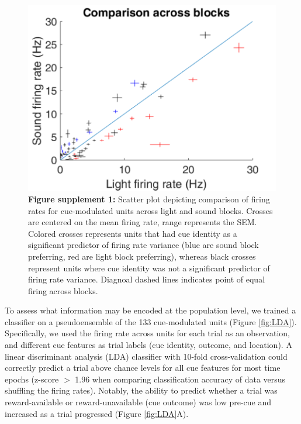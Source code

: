 \documentclass[11pt]{article}
\newcommand{\bsf}[1]{\textbf{#1}}
\begin{document}
 \begin{figure}[ht!]
\centering
\includegraphics[height=0.3\textheight]{Fig 6 - SUPP scatter.pdf}
\caption*{\bsf{Figure supplement 1:} Scatter plot depicting comparison
  of firing rates for cue-modulated units across light and sound
  blocks. Crosses are centered on the mean firing rate, range
  represents the SEM. Colored crosses represents units that had cue
  identity as a significant predictor of firing rate variance (blue
  are sound block preferring, red are light block preferring), whereas
  black crosses represent units where cue identity was not a
  significant predictor of firing rate variance. Diagnoal dashed lines
  indicates point of equal firing across blocks.}
\label{fig:scat}
\end{figure} \clearpage

To assess what information may be encoded at the population level, we
trained a classifier on a pseudoensemble of the 133 cue-modulated
units (Figure \ref{fig:LDA}). Specifically, we used the firing rate
across units for each trial as an observation, and different cue
features as trial labels (cue identity, outcome, and location). A
linear discriminant analysis (LDA) classifier with 10-fold
cross-validation could correctly predict a trial above chance levels
for all cue features for most time epochs (z-score $>$ 1.96 when
comparing classification accuracy of data versus shuffling the firing
rates). Notably, the ability to predict whether a trial was
reward-available or reward-unavailable (cue outcome) was low pre-cue
and increased as a trial progressed (Figure \ref{fig:LDA}A).
\end{document}

